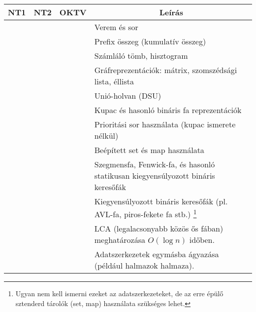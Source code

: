 \documentclass[a4paper,11pt,oneside]{article}
\newcommand{\cmark}{\ding{51}}%
\newcommand{\xmark}{\ding{55}}%
\newcommand{\cincl}{{\small\cmark}}
\newcommand{\cdefi}{{\small\cmark\faFileTextO}}
\newcommand{\ccode}{{\small\cmark\faFileText}}
\newcommand{\cemay}{{\small\xmark\faQuestionCircle}}
\newcommand{\cexcl}{{\small\xmark}}
\newcommand{\ctable}[1]{
    \begin{center}
        \begin{longtable}{ | C | C | C | m{8cm} | } %
        \hline
        \textbf{NT1} & \textbf{NT2} & \textbf{OKTV} & \multicolumn{1}{|c|}{\textbf{Leírás}} \\ \hline
        \endhead
        #1
        \end{longtable}
    \end{center}
}
\begin{document}
\ctable {
    \ccode & \cdefi & \cincl & Verem és sor
    \\ \hline %
    \ccode & \cdefi & \cincl & Prefix összeg (kumulatív összeg)
    \\ \hline %
    \ccode & \ccode & \ccode & Számláló tömb, hisztogram
    \\ \hline %
    \cemay & \cdefi & \cincl & Gráfreprezentációk: mátrix, szomszédsági lista, éllista
    \\ \hline %
    \cexcl & \ccode & \cincl & Unió-holvan (DSU)
    \\ \hline %
    \cexcl & \cdefi & \cdefi & Kupac és hasonló bináris fa reprezentációk
    \\ \hline %
    \cexcl & \cdefi & \cincl & Prioritási sor használata (kupac ismerete nélkül)
    \\ \hline 
    \cexcl & \ccode & \ccode & Beépített set és map használata
    \\ \hline 
    \cexcl & \cexcl & \cemay & Szegmensfa, Fenwick-fa, és hasonló statikusan kiegyensúlyozott bináris keresőfák
    \\ \hline %
    \cexcl & \cexcl & \cexcl & Kiegyensúlyozott bináris keresőfák (pl. AVL-fa, piros-fekete fa stb.)
        \footnote{Ugyan nem kell ismerni ezeket az adatszerkezeteket, de az erre épülő sztenderd tárolók (set, map) használata szükséges lehet.}
    \\ \hline %
    \cexcl & \cexcl & \cemay & LCA (legalacsonyabb közös ős fában) meghatározása $O(\log n)$ időben.
    \\ \hline %
    \cexcl & \cemay & \ccode & Adatszerkezetek egymásba ágyazása (például halmazok halmaza).
}
\end{document}
